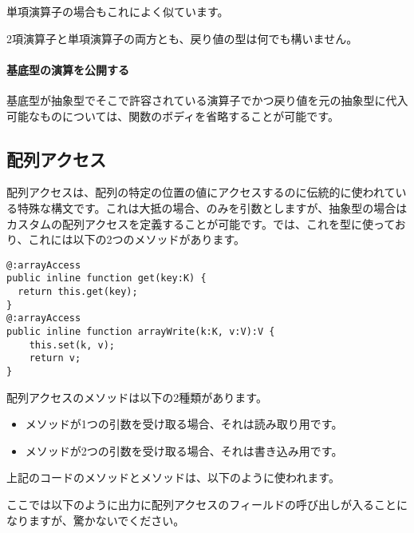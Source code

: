 単項演算子の場合もこれによく似ています。


2項演算子と単項演算子の両方とも、戻り値の型は何でも構いません。

\paragraph{基底型の演算を公開する}

基底型が抽象型でそこで許容されている演算子でかつ戻り値を元の抽象型に代入可能なものについては、関数のボディを省略することが可能です。



\subsection{配列アクセス}
\label{types-abstract-array-access}

配列アクセスは、配列の特定の位置の値にアクセスするのに伝統的に使われている特殊な構文です。これは大抵の場合、のみを引数としますが、抽象型の場合はカスタムの配列アクセスを定義することが可能です。では、これを型に使っており、これには以下の2つのメソッドがあります。

\begin{lstlisting}
@:arrayAccess
public inline function get(key:K) {
  return this.get(key);
}
@:arrayAccess
public inline function arrayWrite(k:K, v:V):V {
	this.set(k, v);
	return v;
}
\end{lstlisting}

配列アクセスのメソッドは以下の2種類があります。

\begin{itemize}
	\item {}メソッドが1つの引数を受け取る場合、それは読み取り用です。
	\item {}メソッドが2つの引数を受け取る場合、それは書き込み用です。
\end{itemize}

上記のコードのメソッドとメソッドは、以下のように使われます。


ここでは以下のように出力に配列アクセスのフィールドの呼び出しが入ることになりますが、驚かないでください。

